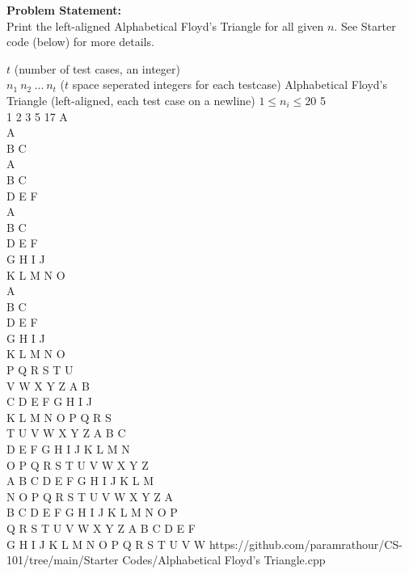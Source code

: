 \textbf{Problem Statement:}\\
Print the left-aligned Alphabetical Floyd's Triangle for all given $n$. See Starter code (below) for more details.
\begin{testcases}
	{$t$ \hfill(number of test cases, an integer)\\$n_1\ n_2\ \ldots\ n_t$ \hfill($t$ space seperated integers for each testcase)}
	{Alphabetical Floyd's Triangle \hfill(left-aligned, each test case on a newline)}
	{$1 \leq n_i \leq 20$}
	{5\\1 2 3 5 17}
	{A\\[1em]A\\B C\\[1em]A\\B C\\D E F\\[1em]A\\B C\\D E F\\G H I J\\K L M N O\\[1em]A\\B C\\D E F\\G H I J\\K L M N O\\P Q R S T U\\V W X Y Z A B\\C D E F G H I J\\K L M N O P Q R S\\T U V W X Y Z A B C\\D E F G H I J K L M N\\O P Q R S T U V W X Y Z\\A B C D E F G H I J K L M\\N O P Q R S T U V W X Y Z A\\B C D E F G H I J K L M N O P\\Q R S T U V W X Y Z A B C D E F\\G H I J K L M N O P Q R S T U V W}
	{https://github.com/paramrathour/CS-101/tree/main/Starter Codes/Alphabetical Floyd's Triangle.cpp}
\end{testcases}
